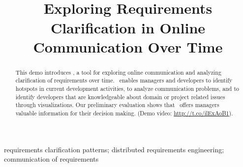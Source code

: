 
\title{\viss\\Exploring Requirements Clarification in Online Communication Over Time}


\author{
}

\maketitle


\begin{abstract}
This demo introduces \viss, a tool for exploring online communication and analyzing clarification of requirements over time.
\viss\ enables managers and developers to identify hotspots in current development activities, to analyze communication problems, and to identify developers that are knowledgeable about domain or project related issues through visualizations.
Our preliminary evaluation shows that \viss\ offers managers valuable information for their decision making.
(Demo video: \url{http://t.co/ilExAoB1}).
\end{abstract}

\begin{IEEEkeywords}
requirements clarification patterns; distributed requirements engineering; communication of requirements
\end{IEEEkeywords}
